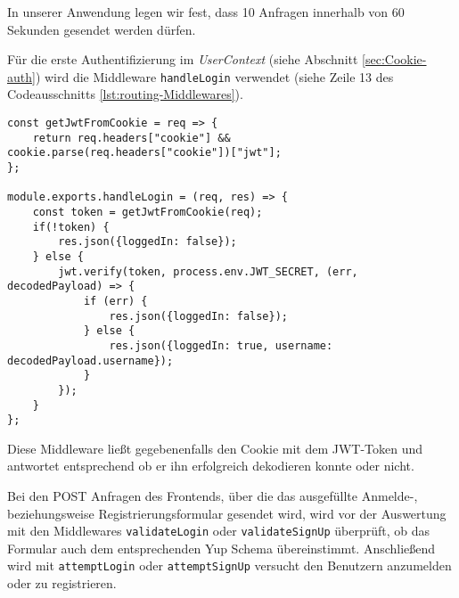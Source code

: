 In unserer Anwendung legen wir fest, dass 10 Anfragen innerhalb von 60 Sekunden gesendet werden dürfen.

Für die erste Authentifizierung im \textit{UserContext} (siehe Abschnitt \ref{sec:Cookie-auth}) wird die Middleware \verb|handleLogin| verwendet (siehe Zeile 13 des Codeausschnitts \ref{lst:routing-Middlewares}).

\begin{lstlisting}[style=codeStyle, caption={Die handleLogin Middleware zum Authentifizieren mit Cookie}, label={lst:handleLogin}]
const getJwtFromCookie = req => {
    return req.headers["cookie"] && cookie.parse(req.headers["cookie"])["jwt"];
};

module.exports.handleLogin = (req, res) => {
    const token = getJwtFromCookie(req);
    if(!token) {
        res.json({loggedIn: false});
    } else {
        jwt.verify(token, process.env.JWT_SECRET, (err, decodedPayload) => {
            if (err) {
                res.json({loggedIn: false});
            } else {
                res.json({loggedIn: true, username: decodedPayload.username});
            }
        });
    }
};
\end{lstlisting}

Diese Middleware ließt gegebenenfalls den Cookie mit dem JWT-Token und antwortet entsprechend ob er ihn erfolgreich dekodieren konnte oder nicht.

Bei den POST Anfragen des Frontends, über die das ausgefüllte Anmelde-, beziehungsweise Registrierungsformular gesendet wird, wird vor der Auswertung mit den Middlewares \verb|validateLogin| oder \verb|validateSignUp| überprüft, ob das Formular auch dem entsprechenden Yup Schema übereinstimmt. Anschließend wird mit \verb|attemptLogin| oder \verb|attemptSignUp| versucht den Benutzern anzumelden oder zu registrieren.

